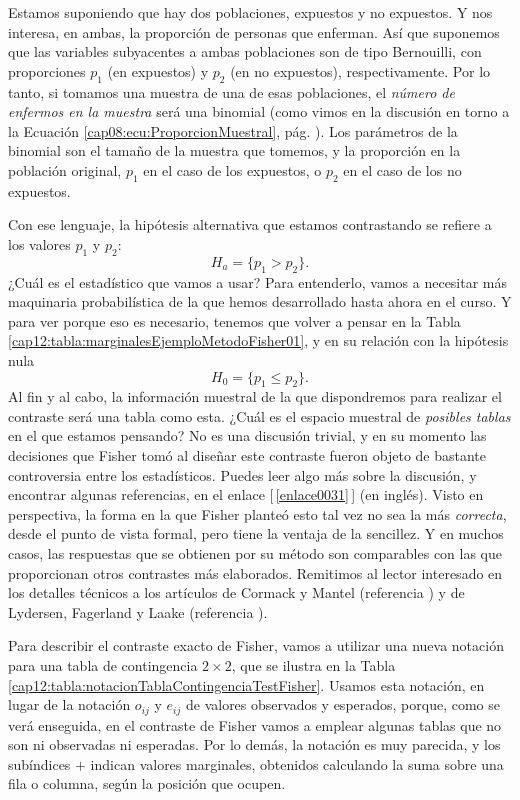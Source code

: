 Estamos suponiendo que hay dos poblaciones, expuestos y no expuestos. Y nos interesa, en ambas, la proporción de personas que enferman. Así que suponemos que las variables subyacentes a ambas poblaciones son de tipo Bernouilli, con proporciones $p_1$  (en expuestos) y $p_2$ (en no expuestos), respectivamente. Por lo tanto, si tomamos una muestra de una de esas poblaciones, el {\em número de enfermos en la muestra} será una binomial (como vimos en la discusión en torno a la Ecuación \ref{cap08:ecu:ProporcionMuestral}, pág. \pageref{cap08:ecu:ProporcionMuestral}). Los parámetros de la binomial son el tamaño de la muestra que tomemos, y la proporción en la población original, $p_1$ en el caso de los expuestos, o $p_2$ en el caso de los no expuestos.

Con ese lenguaje, la hipótesis alternativa que estamos contrastando se refiere a los valores $p_1$ y $p_2$:
\[H_a=\{p_1>p_2\}.\]
¿Cuál es el estadístico que vamos a usar? Para entenderlo, vamos a necesitar más maquinaria probabilística de la que hemos desarrollado hasta ahora en el curso. Y para ver porque eso es necesario, tenemos que volver a pensar en la Tabla \ref{cap12:tabla:marginalesEjemploMetodoFisher01}, y en su relación con la hipótesis nula
\[H_0=\{p_1\leq p_2\}.\]
Al fin y al cabo, la información muestral de la que dispondremos para realizar el contraste será una tabla como esta. ¿Cuál es el espacio muestral de {\em posibles tablas} en el que estamos pensando? No es una discusión trivial, y en su momento las decisiones que Fisher tomó al diseñar este contraste fueron objeto de bastante controversia entre los estadísticos. Puedes leer algo más sobre la discusión, y encontrar algunas referencias, en el enlace [\,\ref{enlace0031}\,]\label{enlace0031a} (en inglés).
Visto en perspectiva, la forma en la que Fisher planteó esto tal vez no sea la más {\em correcta}, desde el punto de vista formal, pero tiene la ventaja de la sencillez. Y en muchos casos, las respuestas que se obtienen por su método son comparables con las que proporcionan otros contrastes más elaborados. Remitimos al lector interesado en los detalles técnicos a los artículos de Cormack y Mantel (referencia \cite{cormack1991fisher}) y de Lydersen, Fagerland y Laake (referencia \cite{lydersen2009recommended}).

Para describir el contraste exacto de Fisher, vamos a utilizar una nueva notación para una tabla de contingencia $2\times 2$, que se ilustra en la Tabla \ref{cap12:tabla:notacionTablaContingenciaTestFisher}. Usamos esta notación, en lugar de la notación $o_{ij}$ y $e_{ij}$ de valores observados y esperados, porque, como se verá enseguida, en el contraste de Fisher vamos a emplear algunas tablas que no son ni observadas ni esperadas.  Por lo demás, la notación es muy parecida, y los subíndices $+$ indican valores marginales, obtenidos calculando la suma sobre una fila o columna, según la posición que ocupen.

